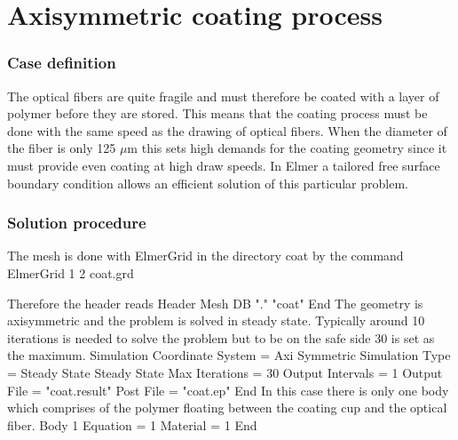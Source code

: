\chapter{Axisymmetric coating process}


\subsection*{Case definition}

The optical fibers are quite fragile and must therefore be coated with
a layer of polymer before they are stored.  This means that the
coating process must be done with the same speed as the drawing of
optical fibers.  When the diameter of the fiber is only 125 $\mu$m
this sets high demands for the coating geometry since it must provide
even coating at high draw speeds. In Elmer a tailored free surface
boundary condition allows an efficient solution of this particular
problem.


\subsection*{Solution procedure}

The mesh is done with ElmerGrid in the directory coat by the command
%
\ttbegin
ElmerGrid 1 2 coat.grd
\ttend

Therefore the header reads 
\ttbegin
Header
  Mesh DB "." "coat"
End
\ttend
%
The geometry is axisymmetric and the problem is solved in steady state. Typically around 10
iterations is needed to solve the problem but to be on the safe side 30 is set as the maximum.
\ttbegin
Simulation
  Coordinate System = Axi Symmetric
  Simulation Type = Steady State
  Steady State Max Iterations = 30
  Output Intervals = 1
  Output File = "coat.result"
  Post File = "coat.ep"
End
\ttend
%
In this case there is only one body which comprises of the polymer 
floating between the coating cup and the optical fiber.
\ttbegin
Body 1
  Equation = 1
  Material = 1
End
\ttend

